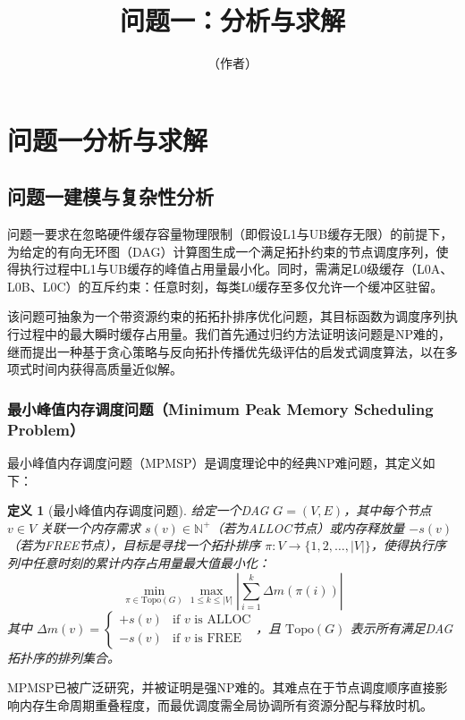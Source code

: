 \documentclass[11pt,a4paper]{article}
\title{问题一：分析与求解}
\author{（作者）}
\date{}
\newtheorem{definition}{定义}
\begin{document}
\maketitle

\section{问题一分析与求解}

\subsection{问题一建模与复杂性分析}
\label{subsec:problem1_analysis}

问题一要求在忽略硬件缓存容量物理限制（即假设L1与UB缓存无限）的前提下，为给定的有向无环图（DAG）计算图生成一个满足拓扑约束的节点调度序列，使得执行过程中L1与UB缓存的峰值占用量最小化。同时，需满足L0级缓存（L0A、L0B、L0C）的互斥约束：任意时刻，每类L0缓存至多仅允许一个缓冲区驻留。

该问题可抽象为一个带资源约束的拓拓扑排序优化问题，其目标函数为调度序列执行过程中的最大瞬时缓存占用量。我们首先通过归约方法证明该问题是NP难的，继而提出一种基于贪心策略与反向拓扑传播优先级评估的启发式调度算法，以在多项式时间内获得高质量近似解。

\subsubsection{最小峰值内存调度问题（Minimum Peak Memory Scheduling Problem）}
\label{subsubsec:min_peak_problem}

最小峰值内存调度问题（MPMSP）是调度理论中的经典NP难问题，其定义如下：

\begin{definition}[最小峰值内存调度问题]
给定一个DAG $ G = (V, E) $，其中每个节点 $ v \in V $ 关联一个内存需求 $ s(v) \in \mathbb{N}^+ $（若为ALLOC节点）或内存释放量 $ -s(v) $（若为FREE节点），目标是寻找一个拓扑排序 $ \pi: V \to \{1, 2, \dots, |V|\} $，使得执行序列中任意时刻的累计内存占用量最大值最小化：
\[
\min_{\pi \in \text{Topo}(G)} \max_{1 \leq k \leq |V|} \left| \sum_{i=1}^{k} \Delta m(\pi(i)) \right|
\]
其中 $ \Delta m(v) = \begin{cases} 
+s(v) & \text{if } v \text{ is ALLOC} \\
-s(v) & \text{if } v \text{ is FREE}
\end{cases} $，且 $ \text{Topo}(G) $ 表示所有满足DAG拓扑序的排列集合。
\end{definition}

MPMSP已被广泛研究，并被证明是强NP难的\cite{Liu2017Memory}。其难点在于节点调度顺序直接影响内存生命周期重叠程度，而最优调度需全局协调所有资源分配与释放时机。
\end{document}
